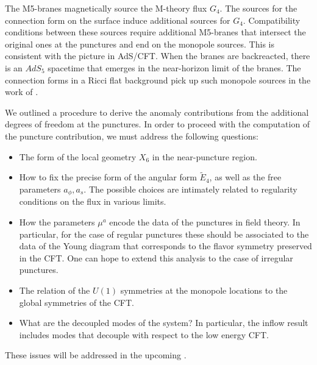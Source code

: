 \documentclass[a4paper,11pt]{article}
\begin{document}
The M5-branes magnetically source the M-theory flux $G_4$. The sources for the connection form on the surface induce additional sources for $G_4$.  Compatibility conditions between these sources require additional M5-branes that intersect the original ones at the punctures and end on the monopole sources. This is consistent with the picture in AdS/CFT.  When the branes are backreacted, there is an $AdS_5$ spacetime that emerges in the near-horizon limit of the branes.  The connection forms in a Ricci flat background pick up such monopole sources in the work of \cite{Gaiotto:2009gz,Bah:2015fwa}.  

We outlined a procedure to derive the anomaly contributions from the additional degrees of freedom at the punctures.  In order to proceed with the computation of the puncture contribution, we must address the following questions:


\begin{itemize}


\item The form of the local geometry $X_6$ in the near-puncture region.

\item How to fix the precise form of the angular form $\widetilde{E}_4$, as well as the free parameters $a_\phi,a_s$. The possible choices are intimately related to regularity conditions on the flux in various limits.

\item How the parameters $\mu^a$ encode the data of the punctures in field theory. In particular, for the case of regular punctures these should be associated to the data of the Young diagram that corresponds to the flavor symmetry preserved in the CFT. One can hope to extend this analysis to the case of irregular punctures. 

\item The relation of the $U(1)$ symmetries at the monopole locations to the global symmetries of the CFT. 



\item What are the decoupled modes of the system? In particular, the inflow result includes modes that decouple with respect to the low energy CFT. 



\end{itemize}
	
These issues will be addressed in the upcoming \cite{Bah:2018bn}.
\end{document}
